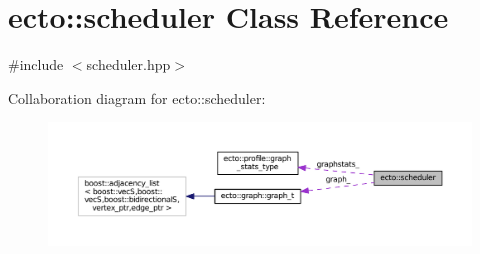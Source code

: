 \hypertarget{classecto_1_1scheduler}{\section{ecto\-:\-:scheduler Class Reference}
\label{classecto_1_1scheduler}
}


{\ttfamily \#include $<$scheduler.\-hpp$>$}



Collaboration diagram for ecto\-:\-:scheduler\-:\nopagebreak
\begin{figure}[H]
\begin{center}
\leavevmode
\includegraphics[width=350pt]{classecto_1_1scheduler__coll__graph}
\end{center}
\end{figure}
